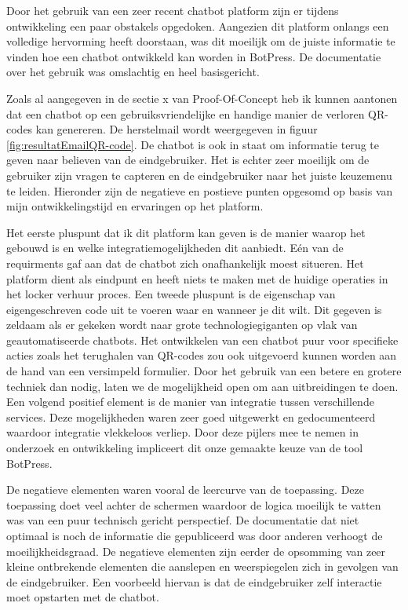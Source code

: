 Door het gebruik van een zeer recent chatbot platform zijn er tijdens ontwikkeling een paar obstakels opgedoken. Aangezien dit platform onlangs een volledige hervorming heeft doorstaan, was dit moeilijk om de juiste informatie te vinden hoe een chatbot ontwikkeld kan worden in BotPress. De documentatie over het gebruik was omslachtig en heel basisgericht. 

Zoals al aangegeven in de sectie x van Proof-Of-Concept heb ik kunnen aantonen dat een chatbot op een gebruiksvriendelijke en handige manier de verloren QR-codes kan genereren. De herstelmail wordt weergegeven in figuur \ref{fig:resultatEmailQR-code}. De chatbot is ook in staat om informatie terug te geven naar believen van de eindgebruiker. Het is echter zeer moeilijk om de gebruiker zijn vragen te capteren en de eindgebruiker naar het juiste keuzemenu te leiden. Hieronder zijn de negatieve en postieve punten opgesomd op basis van mijn ontwikkelingstijd en ervaringen op het platform.

Het eerste pluspunt dat ik dit platform kan geven is de manier waarop het gebouwd is en welke integratiemogelijkheden dit aanbiedt. Eén van de requirments gaf aan dat de chatbot zich onafhankelijk moest situeren. Het platform dient als eindpunt en heeft niets te maken met de huidige operaties in het locker verhuur proces. Een tweede pluspunt is de eigenschap van eigengeschreven code uit te voeren waar en wanneer je dit wilt. Dit gegeven is zeldaam als er gekeken wordt naar grote technologiegiganten op vlak van geautomatiseerde chatbots. 
Het ontwikkelen van een chatbot puur voor specifieke acties zoals het terughalen van QR-codes zou ook uitgevoerd kunnen worden aan de hand van een versimpeld formulier. Door het gebruik van een betere en grotere techniek dan nodig, laten we de mogelijkheid open om aan uitbreidingen te doen. Een volgend positief element is de manier van integratie tussen verschillende services. Deze mogelijkheden waren zeer goed uitgewerkt en gedocumenteerd waardoor integratie vlekkeloos verliep. Door deze pijlers mee te nemen in onderzoek en ontwikkeling impliceert dit onze gemaakte keuze van de tool BotPress.

De negatieve elementen waren vooral de leercurve van de toepassing. Deze toepassing doet veel achter de schermen waardoor de logica moeilijk te vatten was van een puur technisch gericht perspectief. De documentatie dat niet optimaal is noch de informatie die gepubliceerd was door anderen verhoogt de moeilijkheidsgraad. De negatieve elementen zijn eerder de opsomming van zeer kleine ontbrekende elementen die aanslepen en weerspiegelen zich in gevolgen van de eindgebruiker. Een voorbeeld hiervan is dat de eindgebruiker zelf interactie moet opstarten met de chatbot.

